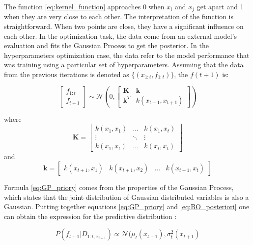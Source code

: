 The function \ref{eq:kernel_function} approaches $0$ when $x_i$ and $x_j$ get apart and 1 when they are very close to each other. The interpretation of the function is straightforward. When two points are close, they have a significant influence on each other. In the optimization task, the data come from an external model's evaluation and fits the Gaussian Process to get the posterior. In the hyperparameters optimization case, the data refer to the model performance that was training using a particular set of hyperparameters.     
Assuming that the data from the previous iterations is denoted as $\{ (x_{1:t}, f_{1:t}) \}$, the $f(t+1)$ is:

\begin{equation}
\label{eq:GP_priory}
    \begin{bmatrix}
         f_{1:t} \\
         f_{t+1}
        \end{bmatrix}  \sim  \mathcal{N}  \left( 0,  \begin{bmatrix}
         \mathbf{K} & \mathbf{k}  \\
         \mathbf{k}^{T} &  k(x_{t+1},x_{t+1})
        \end{bmatrix}  \right)  
\end{equation}

where 
\begin{equation}
    \mathbf{K} = \begin{bmatrix}
         k(x_{1},x_1) & \ldots  &  k(x_{1},x_t)  \\
          \vdots & \ddots & \vdots \\
           k(x_{1},x_t) & \ldots  &  k(x_{t},x_t)
        \end{bmatrix}
\end{equation}
and
\begin{equation}
    \mathbf{k} = \begin{bmatrix}
        k(x_{t+1},x_1) &  k(x_{t+1},x_2) &  \ldots & k(x_{t+1},x_t) 
        \end{bmatrix}
\end{equation}

Formula \ref{eq:GP_priory} comes from the properties of the Gaussian Process, which states that the joint distribution of Gaussian distributed variables is also a Gaussian. Putting together equations \ref{eq:GP_priory} and \ref{eq:BO_posteriori} one can obtain the expression for the predictive distribution \cite{GaussianProcesses}: 

\begin{equation}
    P(f_{t+1}|D_{1:t, x_{t+1}}) \propto \mathcal{N} (\mu_{t}(x_{t+1}), \sigma_{t}^{2}(x_{t+1}) 
\end{equation}

